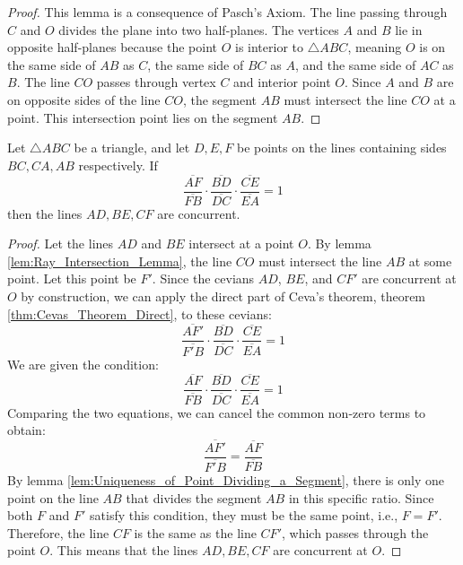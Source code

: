 \begin{proof}
    This lemma is a consequence of Pasch's Axiom. The line passing through $C$ and $O$ divides the plane into two half-planes. The vertices $A$ and $B$ lie in opposite half-planes because the point $O$ is interior to $\triangle ABC$, meaning $O$ is on the same side of $AB$ as $C$, the same side of $BC$ as $A$, and the same side of $AC$ as $B$. The line $CO$ passes through vertex $C$ and interior point $O$. Since $A$ and $B$ are on opposite sides of the line $CO$, the segment $AB$ must intersect the line $CO$ at a point. This intersection point lies on the segment $AB$.
\end{proof}

\begin{theorem}
    \label{thm:Cevas_Theorem_Converse}
    Let $\triangle ABC$ be a triangle, and let $D, E, F$ be points on the lines containing sides $BC, CA, AB$ respectively. If
    \[ \frac{\overline{AF}}{\overline{FB}} \cdot \frac{\overline{BD}}{\overline{DC}} \cdot \frac{\overline{CE}}{\overline{EA}} = 1 \]
    then the lines $AD, BE, CF$ are concurrent.
\end{theorem}

\begin{proof}
    Let the lines $AD$ and $BE$ intersect at a point $O$. By lemma \ref{lem:Ray_Intersection_Lemma}, the line $CO$ must intersect the line $AB$ at some point. Let this point be $F'$.
    Since the cevians $AD$, $BE$, and $CF'$ are concurrent at $O$ by construction, we can apply the direct part of Ceva's theorem, theorem \ref{thm:Cevas_Theorem_Direct}, to these cevians:
    \[ \frac{\overline{AF'}}{\overline{F'B}} \cdot \frac{\overline{BD}}{\overline{DC}} \cdot \frac{\overline{CE}}{\overline{EA}} = 1 \]
    We are given the condition:
    \[ \frac{\overline{AF}}{\overline{FB}} \cdot \frac{\overline{BD}}{\overline{DC}} \cdot \frac{\overline{CE}}{\overline{EA}} = 1 \]
    Comparing the two equations, we can cancel the common non-zero terms to obtain:
    \[ \frac{\overline{AF'}}{\overline{F'B}} = \frac{\overline{AF}}{\overline{FB}} \]
    By lemma \ref{lem:Uniqueness_of_Point_Dividing_a_Segment}, there is only one point on the line $AB$ that divides the segment $AB$ in this specific ratio. Since both $F$ and $F'$ satisfy this condition, they must be the same point, i.e., $F=F'$.
    Therefore, the line $CF$ is the same as the line $CF'$, which passes through the point $O$. This means that the lines $AD, BE, CF$ are concurrent at $O$.
\end{proof}